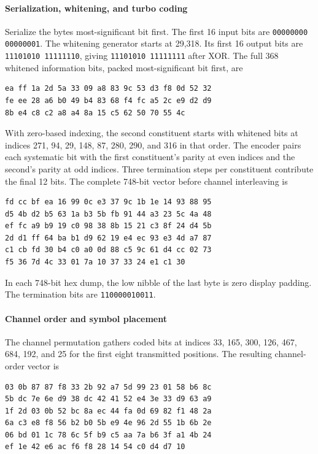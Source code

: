 \paragraph{Serialization, whitening, and turbo coding}
Serialize the bytes most-significant bit first. The first 16 input bits
are \texttt{00000000 00000001}. The whitening generator starts at 29,318.
Its first 16 output bits are \texttt{11101010 11111110}, giving
\texttt{11101010 11111111} after XOR. The full 368 whitened information
bits, packed most-significant bit first, are
\par\noindent\begin{minipage}{\linewidth}
\begin{verbatim}
ea ff 1a 2d 5a 33 09 a8 83 9c 53 d3 f8 0d 52 32
fe ee 28 a6 b0 49 b4 83 68 f4 fc a5 2c e9 d2 d9
8b e4 c8 c2 a8 a4 8a 15 c5 62 50 70 55 4c
\end{verbatim}
\end{minipage}

With zero-based indexing, the second constituent starts with whitened
bits at indices 271, 94, 29, 148, 87, 280, 290, and 316 in that order. The encoder
pairs each systematic bit with the first constituent's parity at even
indices and the second's parity at odd indices. Three termination steps
per constituent contribute the final 12 bits. The complete 748-bit
vector before channel interleaving is
\begin{verbatim}
fd cc bf ea 16 99 0c e3 37 9c 1b 1e 14 93 88 95
d5 4b d2 b5 63 1a b3 5b fb 91 44 a3 23 5c 4a 48
ef fc a9 b9 19 c0 98 38 8b 15 21 c3 8f 24 d4 5b
2d d1 ff 64 ba b1 d9 62 19 e4 ec 93 e3 4d a7 87
c1 cb fd 30 b4 c0 a0 0d 88 c5 9c 61 d4 cc 02 73
f5 36 7d 4c 33 01 7a 10 37 33 24 e1 c1 30
\end{verbatim}
In each 748-bit hex dump, the low nibble of the last byte is zero
display padding. The termination bits are \texttt{110000010011}.

\paragraph{Channel order and symbol placement}
The channel permutation gathers coded bits at indices
33, 165, 300, 126, 467, 684, 192, and 25 for the first eight transmitted positions.
The resulting channel-order vector is
\begin{verbatim}
03 0b 87 87 f8 33 2b 92 a7 5d 99 23 01 58 b6 8c
5b dc 7e 6e d9 38 dc 42 41 52 e4 3e 33 d9 63 a9
1f 2d 03 0b 52 bc 8a ec 44 fa 0d 69 82 f1 48 2a
6a c3 e8 f8 56 b2 b0 5b e9 4e 96 2d 55 1b 6b 2e
06 bd 01 1c 78 6c 5f b9 c5 aa 7a b6 3f a1 4b 24
ef 1e 42 e6 ac f6 f8 28 14 54 c0 d4 d7 10
\end{verbatim}

